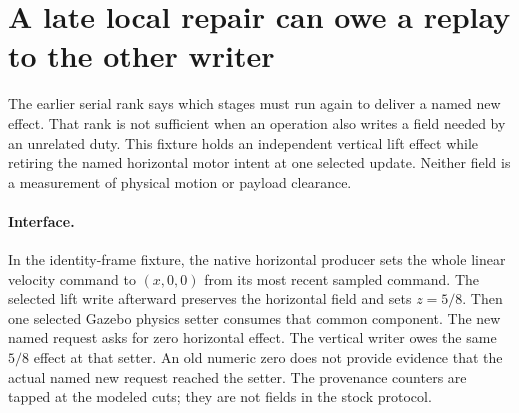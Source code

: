 \documentclass{article}
\begin{document}
\section*{A late local repair can owe a replay to the other writer}
The earlier serial rank says which stages must run again to deliver
a named new effect. That rank is not sufficient when an operation
also writes a field needed by an unrelated duty. This fixture holds
an independent vertical lift effect while retiring the named
horizontal motor intent at one selected update. Neither field is
a measurement of physical motion or payload clearance.

\paragraph{Interface.}
In the identity-frame fixture, the native horizontal producer
sets the whole linear velocity command to $(x,0,0)$ from its most
recent sampled command. The selected lift write afterward preserves
the horizontal field and sets $z=5/8$. Then one selected Gazebo
physics setter consumes that common component. The new named
request asks for zero horizontal effect. The vertical writer owes the
same $5/8$ effect at that setter. An old numeric zero does not
provide evidence that the actual named new request reached the
setter. The provenance counters are tapped at the modeled cuts;
they are not fields in the stock protocol.
\end{document}
